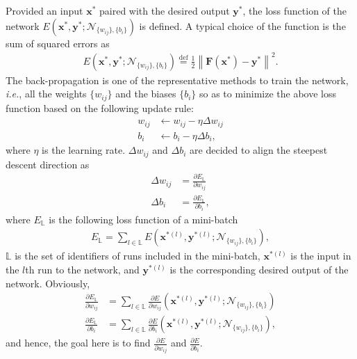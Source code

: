 \documentclass{article}
\begin{document}
Provided an input $\bm{x}^{*}$ paired with the desired output $\bm{y}^{*}$,
the loss function of the network $E(\bm{x}^{*},\bm{y}^{*};\mathcal{N}_{\{w_{ij}\},\{b_{i}\}})$ is defined.
A typical choice of the function is the sum of squared errors as
\begin{align}
E(\bm{x}^{*},\bm{y}^{*};\mathcal{N}_{\{w_{ij}\},\{b_{i}\}})\overset{\mathrm{def}}{=}
\frac{1}{2}\left\|\bm{F}(\bm{x}^{*})-\bm{y}^{*}\right\|^{2}.
\end{align}
The back-propagation is one of the representative methods
to train the network, \textit{i.e.}, all the weights $\{w_{ij}\}$ and the biases $\{b_{i}\}$
so as to minimize the above loss function
based on the following update rule:
\begin{align}
w_{ij}&\leftarrow w_{ij}-\eta\varDelta w_{ij}
\\
b_{i}&\leftarrow b_{i}-\eta\varDelta b_{i},
\end{align}
where
$\eta$ is the learning rate.
$\varDelta w_{ij}$ and $\varDelta b_{i}$ are decided
to align the steepest descent direction as
\begin{align}
\varDelta w_{ij}&=\frac{\partial E_{\mathbb{L}}}{\partial w_{ij}} \\
\varDelta b_{i}&=\frac{\partial E_{\mathbb{L}}}{\partial b_{i}},
\end{align}
where
$E_{\mathbb{L}}$ is the following loss function of a mini-batch
\begin{align}
E_{\mathbb{L}}=\sum_{l\in\mathbb{L}}E(\bm{x}^{*(l)},\bm{y}^{*(l)};\mathcal{N}_{\{w_{ij}\},\{b_{i}\}}),
\end{align}
$\mathbb{L}$ is the set of identifiers of runs included in the mini-batch,
$\bm{x}^{*(l)}$ is the input in the $l$th run to the network,
and $\bm{y}^{*(l)}$ is the corresponding desired output of the network.
Obviously,
\begin{align}
\frac{\partial E_{\mathbb{L}}}{\partial w_{ij}}
&=\sum_{l\in\mathbb{L}}\frac{\partial E}{\partial w_{ij}}(\bm{x}^{*(l)},\bm{y}^{*(l)};\mathcal{N}_{\{w_{ij}\},\{b_{i}\}})
\\
\frac{\partial E_{\mathbb{L}}}{\partial b_{i}}
&=\sum_{l\in\mathbb{L}}\frac{\partial E}{\partial b_{i}}(\bm{x}^{*(l)},\bm{y}^{*(l)};\mathcal{N}_{\{w_{ij}\},\{b_{i}\}}),
\end{align}
and hence,
the goal here is to find
$\frac{\partial E}{\partial w_{ij}}$
and $\frac{\partial E}{\partial b_{i}}$.

\bigskip
\end{document}
